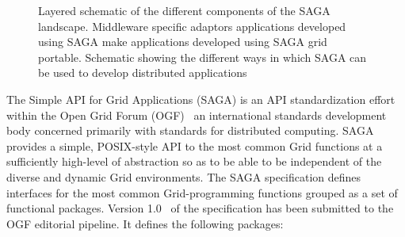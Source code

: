 \documentclass[conference,final]{IEEEtran}
\begin{document}
\begin{figure}[!h]
  \begin{center}
  \end{center}
  \caption{Layered schematic of the different components of the SAGA
    landscape.  Middleware specific adaptors applications developed
    using SAGA make applications developed using SAGA grid
    portable. Schematic showing the different ways in which SAGA can
    be used to develop distributed applications}
 \label{sagalayer}
\end{figure}

The Simple API for Grid Applications (SAGA) is an API standardization
effort within the Open Grid Forum (OGF)~\cite{ogf_web} an
international standards development body concerned primarily with
standards for distributed computing.  SAGA provides a simple,
POSIX-style API to the most common Grid functions at a sufficiently
high-level of abstraction so as to be able to be independent of the
diverse and dynamic Grid environments.  The SAGA specification defines
interfaces for the most common Grid-programming functions grouped as a
set of functional packages.  Version 1.0~\cite{saga-core} of the
specification has been submitted to the OGF editorial pipeline.  It
defines the following packages:
\end{document}
